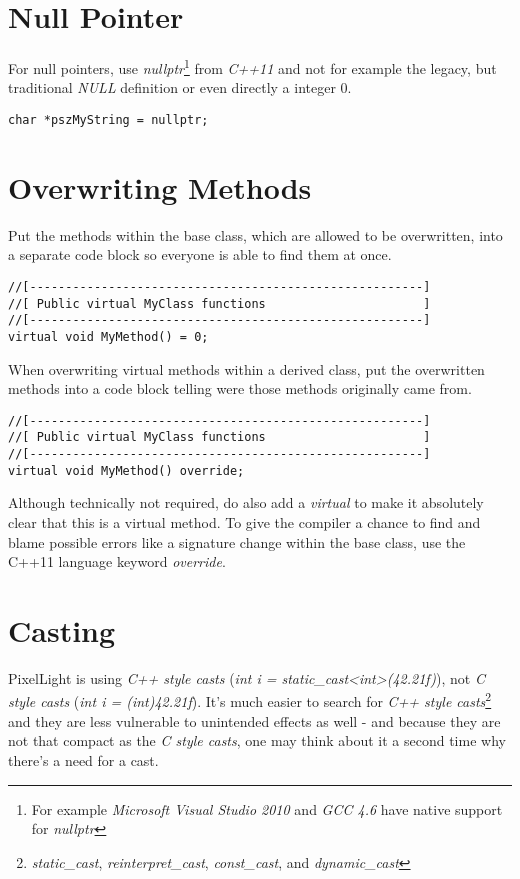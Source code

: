 \section{Null Pointer}
For null pointers, use \emph{nullptr}\footnote{For example \emph{Microsoft Visual Studio 2010} and \emph{\ac{GCC} 4.6} have native support for \emph{nullptr}} from \emph{C++11} and not for example the legacy, but traditional \emph{NULL} definition or even directly a integer $0$.

\begin{lstlisting}[caption=Null pointer]
char *pszMyString = nullptr;
\end{lstlisting}




\section{Overwriting Methods}
Put the methods within the base class, which are allowed to be overwritten, into a separate code block so everyone is able to find them at once.
\begin{lstlisting}[caption=Virtual methods within a base class]
//[-------------------------------------------------------]
//[ Public virtual MyClass functions                      ]
//[-------------------------------------------------------]
virtual void MyMethod() = 0;
\end{lstlisting}

When overwriting virtual methods within a derived class, put the overwritten methods into a code block telling were those methods originally came from.
\begin{lstlisting}[caption=Overwriting virtual methods within a derived class]
//[-------------------------------------------------------]
//[ Public virtual MyClass functions                      ]
//[-------------------------------------------------------]
virtual void MyMethod() override;
\end{lstlisting}
Although technically not required, do also add a \emph{virtual} to make it absolutely clear that this is a virtual method. To give the compiler a chance to find and blame possible errors like a signature change within the base class, use the C++11 language keyword \emph{override}.




\section{Casting}
PixelLight is using \emph{C++ style casts} (\emph{int i = static\_cast<int>(42.21f)}), not \emph{C style casts} (\emph{int i = (int)42.21f}). It's much easier to search for \emph{C++ style casts}\footnote{\emph{static\_cast}, \emph{reinterpret\_cast}, \emph{const\_cast}, and \emph{dynamic\_cast}} and they are less vulnerable to unintended effects as well - and because they are not that compact as the \emph{C style casts}, one may think about it a second time why there's a need for a cast.

